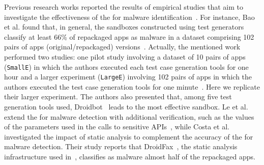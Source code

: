 






Previous research works reported the results of empirical studies that aim to investigate the effectiveness of
the \mas for malware identification~\cite{DBLP:conf/wcre/BaoLL18,DBLP:conf/scam/CostaMCMVBC20}.
For instance, Bao et al. found that, in general, the sandboxes constructed using test generators classify at least 66\% of repackaged apps as malware in a dataset comprising 102 pairs of apps (original/repackaged) versions~\cite{DBLP:conf/wcre/BaoLL18}.
{\color{blue}Actually, the mentioned work performed two studies: one pilot study involving a dataset
of 10 pairs of apps (\texttt{SmallE}) in which the authors executed each test case generation tools for one hour and a larger experiment
(\texttt{LargeE}) involving 102 pairs of
apps in which the authors executed the test case generation tools for one minute~\cite{DBLP:conf/wcre/BaoLL18}.}
Here we replicate their larger experiment. 
The authors also presented that, among five test generation tools used, Droidbot~\cite{DBLP:conf/icse/LiYGC17} leads to the most effective sandbox.
Le et al. extend the \mas for malware detection with additional verification,
such as the values of the parameters used in the
calls to sensitive APIs~\cite{le2018towards}, while
Costa et al.\cite{DBLP:journals/jss/CostaMMSSBNR22} investigated the impact of static analysis to complement the accuracy of the \mas
for malware detection. Their study reports that DroidFax~\cite{DBLP:conf/icsm/CaiR17a}, the static analysis infrastructure used in~\cite{DBLP:conf/wcre/BaoLL18}, classifies as malware almost half of the repackaged apps.

